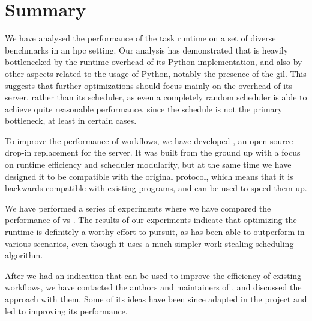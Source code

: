 \section{Summary}
We have analysed the performance of the \dask{} task runtime on a set of
diverse benchmarks in an \gls{hpc} setting. Our analysis has demonstrated that
\dask{} is heavily bottlenecked by the runtime overhead of its Python
implementation, and also by other aspects related to the usage of Python, notably the presence of
the \gls{gil}. This suggests that further optimizations should focus mainly on
the overhead of its server, rather than its scheduler, as even a completely random scheduler is
able to achieve quite reasonable performance, since the schedule is not the primary bottleneck, at
least in certain cases.

To improve the performance of \dask{} workflows, we have developed
\rsds{}, an open-source drop-in replacement for the \dask{}
server. It was built from the ground up with a focus on runtime
efficiency and scheduler modularity, but at the same time we have designed it to be compatible with
the original \dask{} protocol, which means that it is backwards-compatible with
existing \dask{} programs, and can be used to speed them up.

We have performed a series of experiments where we have compared the performance of
\rsds{} vs \dask{}. The results of our experiments indicate
that optimizing the runtime is definitely a worthy effort to pursuit, as
\rsds{} has been able to outperform \dask{} in various
scenarios, even though it uses a much simpler work-stealing scheduling algorithm.

After we had an indication that \rsds{} can be used to improve the efficiency
of existing \dask{} workflows, we have contacted the authors and maintainers of
\dask{}, and discussed the \rsds{} approach with
them. Some of its
ideas have been since adapted in the \dask{} project and led to improving its
performance.
